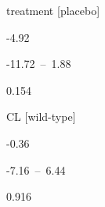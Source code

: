 \documentclass[
  letterpaper,
  DIV=11,
  numbers=noendperiod]{scrartcl}
\begin{document}
\begin{table}
\begin{minipage}[t]{\linewidth}
{treatment {[}placebo{]}

}

\end{minipage}%
\newline
\begin{minipage}[t]{\linewidth}

{\centering 

-4.92

}

\end{minipage}%
\newline
\begin{minipage}[t]{\linewidth}

{\centering 

-11.72~--~1.88

}

\end{minipage}%
\newline
\begin{minipage}[t]{\linewidth}

{\centering 

0.154

}

\end{minipage}%
\newline
\begin{minipage}[t]{\linewidth}

{\centering 

CL {[}wild-type{]}

}

\end{minipage}%
\newline
\begin{minipage}[t]{\linewidth}

{\centering 

-0.36

}

\end{minipage}%
\newline
\begin{minipage}[t]{\linewidth}

{\centering 

-7.16~--~6.44

}

\end{minipage}%
\newline
\begin{minipage}[t]{\linewidth}

{\centering 

0.916

}
\end{minipage}
\end{table}
\end{document}
